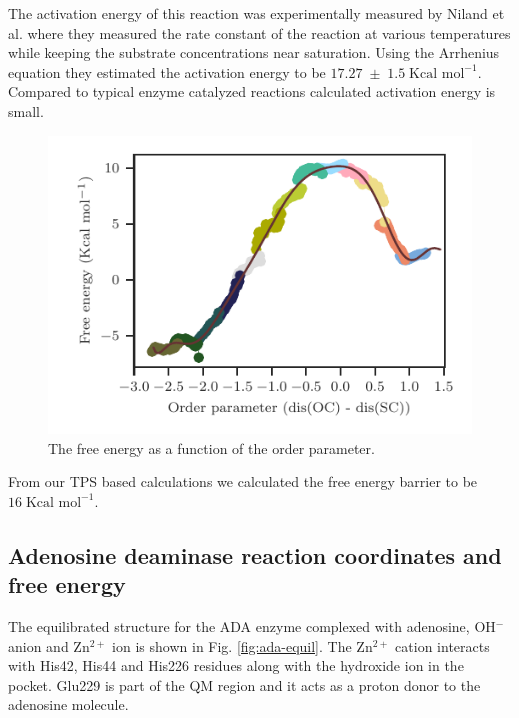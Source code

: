 \documentclass[journal=jpcbfk,manuscript=article,layout=twocolumn]{achemso}
\begin{document}
The activation energy of this reaction was experimentally measured by 
Niland et al. \cite{Niland21Biochem60p791} where they measured the rate 
constant of the reaction at various temperatures while keeping the 
substrate concentrations near saturation. Using the Arrhenius equation 
they estimated the activation energy to be $17.27\;\pm\;1.5\;
\text{Kcal mol}^{-1}$. Compared to typical enzyme catalyzed 
reactions calculated activation energy is small.  

\begin{figure}
\includegraphics[scale=1.0]{figures/mat2a-fenergy.pdf}
\caption{The free energy as a function of the order parameter.}
\end{figure}
From our TPS based calculations we calculated the free energy barrier to be 
$16\;\text{Kcal mol}^{-1}$.
\subsection{Adenosine deaminase reaction coordinates and free energy}
The equilibrated structure for the ADA enzyme complexed with adenosine, 
OH$^{-}$ anion and Zn$^{2+}$ ion is shown in Fig. \ref{fig:ada-equil}.
The Zn$^{2+}$ cation interacts with His42, His44 and His226 residues
along with the hydroxide ion in the pocket. Glu229 is part of the 
QM region and it acts as a proton donor to the adenosine molecule.  
\end{document}
